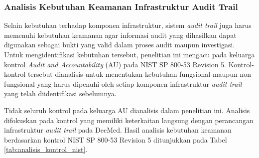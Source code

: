 \subsubsection{Analisis Kebutuhan Keamanan Infrastruktur Audit Trail}

Selain kebutuhan terhadap komponen infrastruktur, sistem \textit{audit trail} juga harus memenuhi kebutuhan keamanan agar informasi audit yang dihasilkan dapat digunakan sebagai bukti yang valid dalam proses audit maupun investigasi. Untuk mengidentifikasi kebutuhan tersebut, penelitian ini mengacu pada keluarga kontrol \textit{Audit and Accountability} (AU) pada NIST SP 800-53 Revision 5. Kontrol-kontrol tersebut dianalisis untuk menentukan kebutuhan fungsional maupun non-fungsional yang harus dipenuhi oleh setiap komponen infrastruktur \textit{audit trail} yang telah diidentifikasi sebelumnya.

Tidak seluruh kontrol pada keluarga AU dianalisis dalam penelitian ini. Analisis difokuskan pada kontrol yang memiliki keterkaitan langsung dengan perancangan infrastruktur \textit{audit trail} pada DecMed. Hasil analisis kebutuhan keamanan berdasarkan kontrol NIST SP 800-53 Revision 5 ditunjukkan pada Tabel \ref{tab:analisis_kontrol_nist}.

